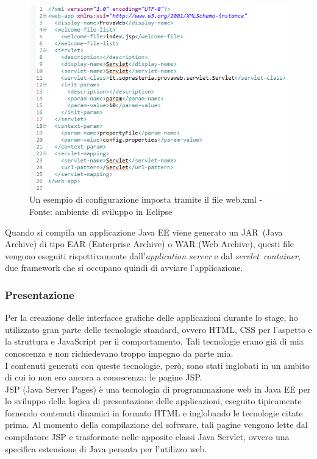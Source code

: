 	\begin{figure}[H]
		\centering
	   	\includegraphics[width=1\textwidth]{immagini/web_xml}
	   	\caption{Un esempio di configurazione imposta tramite il file web.xml - Fonte: ambiente di sviluppo in Eclipse}
	\end{figure}
	
	Quando si compila un applicazione Java EE viene generato un JAR\glossario\ (Java Archive) di tipo EAR (Enterprise Archive) o WAR (Web Archive), questi file vengono eseguiti rispettivamente dall'\textit{application server} e dal \textit{servlet}\glossario\ \textit{container}, due framework che si occupano quindi di avviare l'applicazione. 
	
	\subsubsection{Presentazione}
	
	Per la creazione delle interfacce grafiche delle applicazioni durante lo stage, ho utilizzato gran parte delle tecnologie standard, ovvero HTML, CSS per l'aspetto e la struttura e JavaScript per il comportamento. Tali tecnologie erano già di mia conoscenza e non richiedevano troppo impegno da parte mia.\\
	
	I contenuti generati con queste tecnologie, però, sono stati inglobati in un ambito di cui io non ero ancora a conoscenza: le pagine JSP.\\
	
	JSP (Java Server Pages) è una tecnologia di programmazione web in Java EE per lo sviluppo della logica di presentazione delle applicazioni, eseguito tipicamente fornendo contenuti dinamici in formato HTML e inglobando le tecnologie citate prima. Al momento della compilazione del software, tali pagine vengono lette dal compilatore JSP e trasformate nelle apposite classi Java Servlet\glossario , ovvero una specifica estensione di Java pensata per l'utilizzo web.
	
